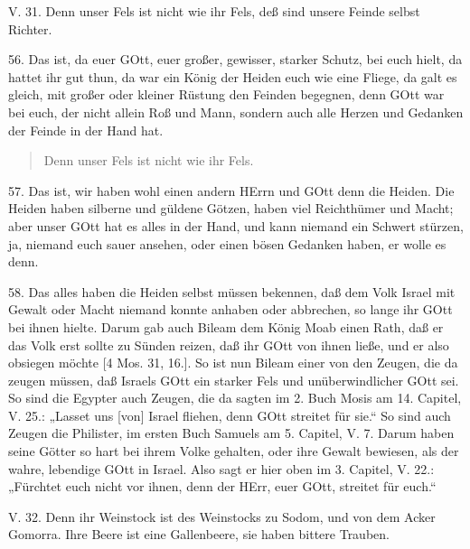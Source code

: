 \begin{schriftzitat}
V. 31. Denn unser Fels ist nicht wie ihr Fels, deß sind unsere Feinde selbst Richter.
\end{schriftzitat}

56. Das ist, da euer GOtt, euer großer, gewisser, starker Schutz, bei euch hielt, da hattet ihr gut thun, da war ein König der Heiden euch wie eine Fliege, da galt es gleich, mit großer oder kleiner Rüstung den Feinden begegnen, denn GOtt war bei euch, der nicht allein Roß und Mann, sondern auch alle Herzen und Gedanken der Feinde in der Hand hat.

\begin{quote}
Denn unser Fels ist nicht wie ihr Fels.
\end{quote}

57. Das ist, wir haben wohl einen andern HErrn und GOtt denn die Heiden. Die Heiden haben silberne und güldene Götzen, haben viel Reichthümer und Macht; aber unser GOtt hat es alles in der Hand, und kann niemand ein Schwert stürzen, ja, niemand euch sauer ansehen, oder einen bösen Gedanken haben, er wolle es denn.

58. Das alles haben die Heiden selbst müssen bekennen, daß dem Volk Israel mit Gewalt oder Macht niemand konnte anhaben oder abbrechen, so lange ihr GOtt bei ihnen hielte. Darum gab auch Bileam dem König Moab einen Rath, daß er das Volk erst sollte zu Sünden reizen, daß ihr GOtt von ihnen ließe, und er also obsiegen möchte [4 Mos. 31, 16.]. So ist nun Bileam einer von den Zeugen, die da zeugen müssen, daß Israels GOtt ein starker Fels und unüberwindlicher GOtt sei. So sind die Egypter auch Zeugen, die da sagten im 2. Buch Mosis am 14. Capitel, V. 25.: „Lasset uns [von] Israel fliehen, denn GOtt streitet für sie.“ So sind auch Zeugen die Philister, im ersten Buch Samuels am 5. Capitel, V. 7. Darum haben seine Götter so hart bei ihrem Volke gehalten, oder ihre Gewalt bewiesen, als der wahre, lebendige GOtt in Israel. Also sagt er hier oben im 3. Capitel, V. 22.: „Fürchtet euch nicht vor ihnen, denn der HErr, euer GOtt, streitet für euch.“

\begin{schriftzitat}
V. 32. Denn ihr Weinstock ist des Weinstocks zu Sodom, und von dem Acker Gomorra. Ihre Beere ist eine Gallenbeere, sie haben bittere Trauben.
\end{schriftzitat}

